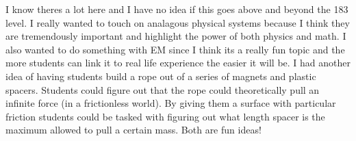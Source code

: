\documentclass[a4paper, 12pt]{../../config/homework}
\begin{document}
I know theres a lot here and I have no idea if this goes above and beyond the 183 level. I really wanted to touch on analagous physical systems because I think they are tremendously important and highlight the power of both physics and math. I also wanted to do something with EM since I think its a really fun topic and the more students can link it to real life experience the easier it will be. I had another idea of having students build a rope out of a series of magnets and plastic spacers. Students could figure out that the rope could theoretically pull an infinite force (in a frictionless world). By giving them a surface with particular friction students could be tasked with figuring out what length spacer is the maximum allowed to pull a certain mass. Both are fun ideas!
\end{document}
